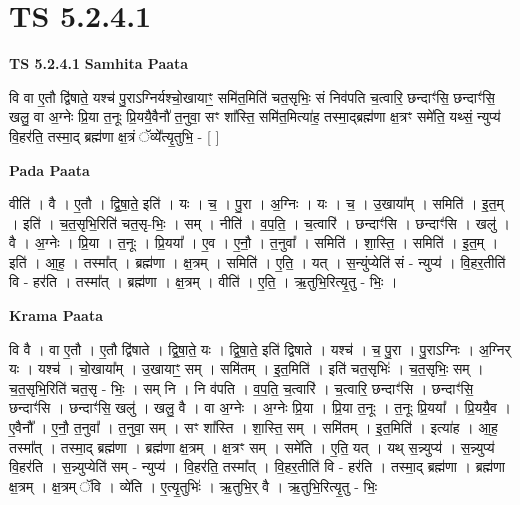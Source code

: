 \documentclass[17pt]{extarticle}
\begin{document}
\section{ TS 5.2.4.1 }

\textbf{TS 5.2.4.1 } \newline
\textbf{Samhita Paata} \newline

वि वा ए॒तौ द्वि॑षाते॒ यश्च॑ पु॒राऽग्निर्यश्चो॒खायाꣳ॒॒ समि॑त॒मिति॑ चत॒सृभिः॒ सं निव॑पति च॒त्वारि॒ छन्दाꣳ॑सि॒ छन्दाꣳ॑सि॒ खलु॒ वा अ॒ग्नेः प्रि॒या त॒नूः प्रि॒ययै॒वैनौ॑ त॒नुवा॒ सꣳ शा᳚स्ति॒ समि॑त॒मित्या॑ह॒ तस्मा॒द्ब्रह्म॑णा क्ष॒त्रꣳ समे॑ति॒ यथ्सं॒ न्युप्य॑ वि॒हर॑ति॒ तस्मा॒द् ब्रह्म॑णा क्ष॒त्रं ॅव्ये᳚त्यृ॒तुभि॒ - [  ] \newline

\textbf{Pada Paata} \newline

वीति॑ । वै । ए॒तौ । द्वि॒षा॒ते॒ इति॑ । यः । च॒ । पु॒रा । अ॒ग्निः । यः । च॒ । उ॒खाया᳚म् । समिति॑ । इ॒त॒म् । इति॑ । च॒त॒सृभि॒रिति॑ चत॒सृ-भिः॒ । सम् । नीति॑ । व॒प॒ति॒ । च॒त्वारि॑ । छन्दाꣳ॑सि । छन्दाꣳ॑सि । खलु॑ । वै । अ॒ग्नेः । प्रि॒या । त॒नूः । प्रि॒यया᳚ । ए॒व । ए॒नौ॒ । त॒नुवा᳚ । समिति॑ । शा॒स्ति॒ । समिति॑ । इ॒त॒म् । इति॑ । आ॒ह॒ । तस्मा᳚त् । ब्रह्म॑णा । क्ष॒त्रम् । समिति॑ । ए॒ति॒ । यत् । स॒न्युंप्येति॑ सं - न्युप्य॑ । वि॒हर॒तीति॑ वि - हर॑ति । तस्मा᳚त् । ब्रह्म॑णा । क्ष॒त्रम् । वीति॑ । ए॒ति॒ । ऋ॒तुभि॒रित्यृ॒तु - भिः॒ ।  \newline


\textbf{Krama Paata} \newline

वि वै । वा ए॒तौ । ए॒तौ द्वि॑षाते । द्वि॒षा॒ते॒ यः । द्वि॒षा॒ते॒ इति॑ द्विषाते । यश्च॑ । च॒ पु॒रा । पु॒राऽग्निः । अ॒ग्निर् यः । यश्च॑ । चो॒खाया᳚म् । उ॒खायाꣳ॒॒ सम् । समि॑तम् । इ॒त॒मिति॑ । इति॑ चत॒सृभिः॑ । च॒त॒सृभिः॒ सम् । च॒त॒सृभि॒रिति॑ चत॒सृ - भिः॒ । सम् नि । नि व॑पति । व॒प॒ति॒ च॒त्वारि॑ । च॒त्वारि॒ छन्दाꣳ॑सि । छन्दाꣳ॑सि॒ छन्दाꣳ॑सि । छन्दाꣳ॑सि॒ खलु॑ । खलु॒ वै । वा अ॒ग्नेः । अ॒ग्नेः प्रि॒या । प्रि॒या त॒नूः । त॒नूः प्रि॒यया᳚ । प्रि॒ययै॒व । ए॒वैनौ᳚ । ए॒नौ॒ त॒नुवा᳚ । त॒नुवा॒ सम् । सꣳ शा᳚स्ति । शा॒स्ति॒ सम् । समि॑तम् । इ॒त॒मिति॑ । इत्या॑ह । आ॒ह॒ तस्मा᳚त् । तस्मा॒द् ब्रह्म॑णा । ब्रह्म॑णा क्ष॒त्रम् । क्ष॒त्रꣳ सम् । समे॑ति । ए॒ति॒ यत् । यथ् स॒न्न्युप्य॑ । स॒न्न्युप्य॑ वि॒हर॑ति । स॒न्न्युप्येति॑ सम् - न्युप्य॑ । वि॒हर॑ति॒ तस्मा᳚त् । वि॒हर॒तीति॑ वि - हर॑ति । तस्मा॒द् ब्रह्म॑णा । ब्रह्म॑णा क्ष॒त्रम् । क्ष॒त्रम् ॅवि । व्ये॑ति । ए॒त्यृ॒तुभिः॑ । ऋ॒तुभि॒र् वै । ऋ॒तुभि॒रित्यृ॒तु - भिः॒ \newline
\end{document}
